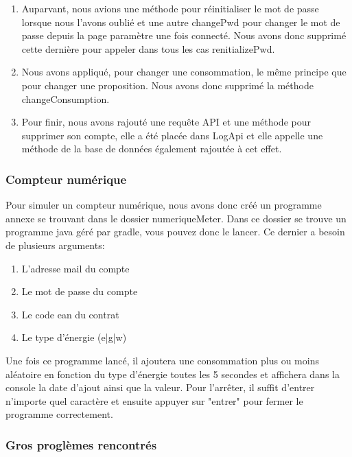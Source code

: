 \begin{enumerate}
\item Auparvant, nous avions une méthode pour réinitialiser le mot de passe lorsque nous l'avons oublié et une autre changePwd pour changer le mot de passe depuis la page paramètre une fois connecté. Nous avons donc supprimé cette dernière pour appeler dans tous les cas renitializePwd.
\item Nous avons appliqué, pour changer une consommation, le même principe que pour changer une proposition. Nous avons donc supprimé la méthode changeConsumption.
\item Pour finir, nous avons rajouté une requête API et une méthode pour supprimer son compte, elle a été placée dans LogApi et elle appelle une méthode de la base de données également rajoutée à cet effet.
\end{enumerate}

\subsubsection{Compteur numérique}

\begin{flushleft}
Pour simuler un compteur numérique, nous avons donc créé un programme annexe se trouvant dans le dossier numeriqueMeter. Dans ce dossier se trouve un programme java géré par gradle, vous pouvez donc le lancer. Ce dernier a besoin de plusieurs arguments:
\end{flushleft}

\begin{enumerate}[-]
\item L'adresse mail du compte
\item Le mot de passe du compte
\item Le code ean du contrat
\item Le type d'énergie (e|g|w)
\end{enumerate}

\begin{flushleft}
Une fois ce programme lancé, il ajoutera une consommation plus ou moins aléatoire en fonction du type d'énergie toutes les 5 secondes et affichera dans la console la date d'ajout ainsi que la valeur. Pour l'arrêter, il suffit d'entrer n'importe quel caractère et ensuite appuyer sur "entrer" pour fermer le programme correctement.
\end{flushleft}

\subsubsection{Gros proglèmes rencontrés}

